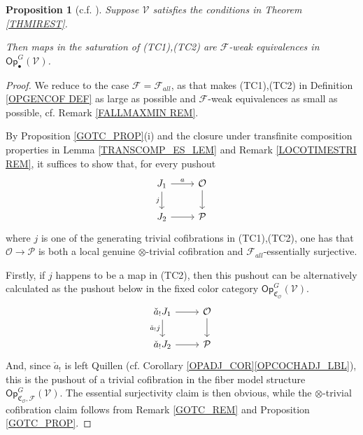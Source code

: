 \documentclass[a4paper,10pt
 ,final
]{article}%
\numberwithin{equation}{section}
\numberwithin{figure}{section}
\newtheorem{proposition}[equation]{Proposition}%
\theoremstyle{definition} %
\newcommand{\F}{\ensuremath{\mathcal F}}
\newcommand{\V}{\ensuremath{\mathcal V}}
\renewcommand{\O}{\ensuremath{\mathcal O}}
\renewcommand{\P}{\ensuremath{\mathcal P}}
\newcommand{\1}{\ensuremath{\mathbbm 1}}%
\begin{document}
\begin{proposition}[{c.f. \cite[4.20]{Cav}}]\label{J_CELL_PROP}
	Suppose $\V$ satisfies the conditions in Theorem \ref{THMIREST}.
      
	Then maps in the saturation of (TC1),(TC2) 
	are $\F$-weak equivalences in $\mathsf{Op}^G_{\bullet}(\V)$.
\end{proposition}



\begin{proof}
	We reduce to the case $\F=\F_{all}$,
	as that makes (TC1),(TC2) in Definition \ref{OPGENCOF DEF} as large as possible 
	and $\mathcal{F}$-weak equivalences as small as possible,
	cf. Remark \ref{FALLMAXMIN REM}.
		
	By Proposition \ref{GOTC_PROP}(i)
	and the closure under transfinite composition properties in Lemma \ref{TRANSCOMP_ES_LEM} and Remark \ref{LOCOTIMESTRI REM},
	it suffices to show that, for every pushout
\begin{equation}\label{JUSTAPUSH EQ}
\begin{tikzcd}
	J_1 \ar{r}{a} \arrow{d}[swap]{j}
&
	\O \arrow{d}
\\
	J_2 \ar{r} 
&
	\P
\end{tikzcd}
\end{equation}
	where $j$ is one of the generating trivial cofibrations 
	in (TC1),(TC2),
	one has that 
	$\O \to \mathcal{P}$ is both a local genuine $\otimes$-trivial cofibration and $\F_{all}$-essentially surjective.

	Firstly, if $j$ happens to be a map in (TC2),
	then this pushout
	can be alternatively calculated as the pushout below
	in the fixed color category $\mathsf{Op}^{G}_{\mathfrak C_{\O}}(\V)$.
\begin{equation}
\begin{tikzcd}
\check{a}_!J_1 \ar{r} \arrow{d}[swap]{\check{a}_!j}
&
\O \arrow{d}
\\
\check{a}_!J_2 \ar{r} 
&
\P
\end{tikzcd}
\end{equation}      
      And, since $\check{a}_!$ is left Quillen (cf. Corollary \ref{OPADJ_COR}\ref{OPCOCHADJ_LBL}), %
      this is the pushout of a trivial cofibration in the fiber model structure
      $\mathsf{Op}^{G}_{\mathfrak C_{\O},\F}(\V)$.
	The essential surjectivity claim is then obvious,
	while the $\otimes$-trivial cofibration
	claim follows from 
	Remark \ref{GOTC_REM} and Proposition \ref{GOTC_PROP}.


\end{proof}
\end{document}
